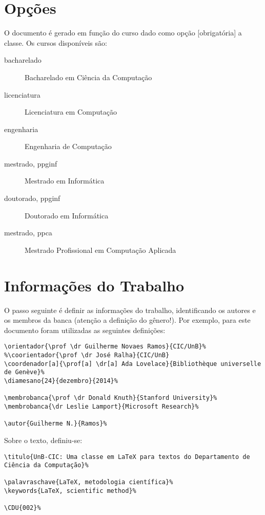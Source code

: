 \section{Opções}
O documento é gerado em função do curso dado como opção [obrigatória] a classe. 
Os cursos disponíveis são:
\begin{description}
  \item[bacharelado] Bacharelado em Ciência da Computação
  \item[licenciatura] Licenciatura em Computação
  \item[engenharia] Engenharia de Computação
  \item[mestrado, ppginf] Mestrado em Informática
  \item[doutorado, ppginf] Doutorado em Informática
  \item[mestrado, ppca] Mestrado Profissional em Computação Aplicada
\end{description}



\section{Informações do Trabalho}%
O passo seguinte é definir as informações do trabalho, identificando os autores 
e os membros da banca (atenção a definição do gênero!). Por exemplo, para este
documento foram utilizadas as seguintes definições:

\begin{verbatim}
\orientador{\prof \dr Guilherme Novaes Ramos}{CIC/UnB}%
%\coorientador{\prof \dr José Ralha}{CIC/UnB}
\coordenador[a]{\prof[a] \dr[a] Ada Lovelace}{Bibliothèque universelle de Genève}%
\diamesano{24}{dezembro}{2014}%

\membrobanca{\prof \dr Donald Knuth}{Stanford University}%
\membrobanca{\dr Leslie Lamport}{Microsoft Research}%

\autor{Guilherme N.}{Ramos}%
\end{verbatim}

Sobre o texto, definiu-se:
\begin{verbatim}
\titulo{UnB-CIC: Uma classe em LaTeX para textos do Departamento de 
Ciência da Computação}%

\palavraschave{LaTeX, metodologia científica}%
\keywords{LaTeX, scientific method}%

\CDU{002}%
\end{verbatim}

